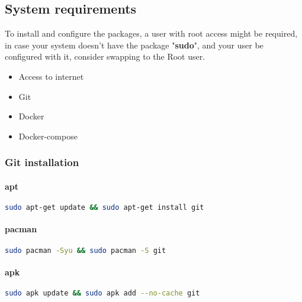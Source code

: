 \subsection{System requirements}\label{subsec:system-requirements}
\begin{flushleft}
    To install and configure the packages, a user with root access might be required, in case your system doesn't have the package
    "\textbf{sudo}", and your user be configured with it, consider swapping to the Root user.
\end{flushleft}

\begin{itemize}
    \item Access to internet
    \item Git
    \item Docker
    \item Docker-compose
\end{itemize}

\subsubsection{Git installation}
\paragraph{apt}
\begin{flushleft}
\begin{lstlisting}[language=bash,label={lst:apt-git}]
sudo apt-get update && sudo apt-get install git\end{lstlisting}
\end{flushleft}

\paragraph{pacman}
\begin{flushleft}
\begin{lstlisting}[language=bash,label={lst:pacman-git}]
sudo pacman -Syu && sudo pacman -S git\end{lstlisting}
\end{flushleft}

\paragraph{apk}
\begin{flushleft}
\begin{lstlisting}[language=bash,label={lst:apk-git}]
sudo apk update && sudo apk add --no-cache git\end{lstlisting}
\end{flushleft}



